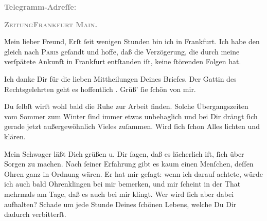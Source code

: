 \pstart
           \textcolor{gray}{\textbf{Telegramm-Adreſſe:}}\pend
           
\pstart
           \textcolor{gray}{\textbf{\textsc{ZeitungFrankfurt Main.}}}\pend
           
\pstart\center{}Mein lieber Freund,\pend\vspace{0.5em}
\pstart
           Erſt{ }ſeit wenigen Stunden bin ich in Frankfurt.
               Ich habe den \label{K_L02823-1v}\label{K_L02823-1} gleich nach \textsc{Paris} geſandt und hoffe, daß die Verzögerung, die
               durch meine verſpätete Ankunft in Frankfurt
               entſtanden iſt, keine{ }ſtörenden Folgen hat.\pend
           
\pstart
           Ich danke Dir für die lieben Mittheilungen Deines Briefes. Der Gattin des Rechtsgelehrten geht es hoffentlich \label{K_L02823-2v}\label{K_L02823-2}. Grüß’{ }ſie{ }ſchön von mir.\pend
           
\pstart
           Du{ }ſelbſt wirſt  wohl bald die \strikeout{\textcolor{gray}{R}} Ruhe zur Arbeit {\pb}finden. Solche
               Übergangszeiten vom Sommer zum Winter{ }ſind immer etwas unbehaglich und bei Dir drängt{ }ſich gerade jetzt außergewöhnlich Vieles zuſammen. Wird{ }ſich{ }ſchon Alles lichten und
               klären.\pend
           
\pstart
           Mein Schwager läßt Dich
               grüßen u. Dir{ }ſagen, daß es lächerlich iſt,{ }ſich über \label{K_L02823-3v}\label{K_L02823-3} Sorgen zu machen. Nach{ }ſeiner Erfahrung gibt
               es kaum einen Menſchen, deſſen Ohren ganz in Ordnung wären. Er hat mir geſagt: wenn
               ich darauf achtete, würde ich auch bald Ohrenklingen  bei mir bemerken, und mir{ }ſcheint in der That\strikeout{,}
               mehrmals am Tage, daß es auch bei mir klingt. {\pb}Wer
               wird{ }ſich aber dabei aufhalten? Schade um jede Stunde Deines{ }ſchönen Lebens, welche
               Du Dir dadurch verbitterſt.\pend
           
